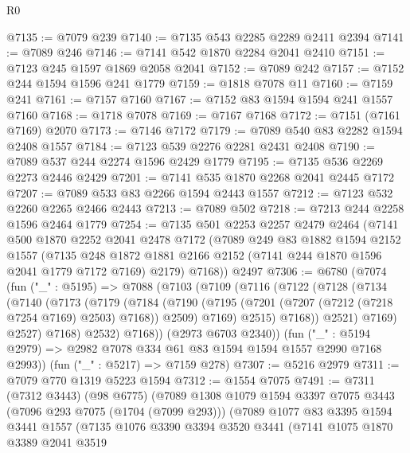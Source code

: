 \begin{lexlean}{R0}
\begin{coremodule}
@7135 := @7079 @239
@7140 := @7135 @543 @2285 @2289 @2411 @2394
@7141 := @7089 @246
@7146 := @7141 @542 @1870 @2284 @2041 @2410
@7151 := @7123 @245 @1597 @1869 @2058 @2041
@7152 := @7089 @242
@7157 := @7152 @244 @1594 @1596 @241 @1779
@7159 := @1818 @7078 @11
@7160 := @7159 @241
@7161 := @7157 @7160
@7167 := @7152 @83 @1594 @1594 @241 @1557 @7160
@7168 := @1718 @7078
@7169 := @7167 @7168
@7172 := @7151 (@7161 @7169) @2070
@7173 := @7146 @7172
@7179 := @7089 @540 @83 @2282 @1594 @2408 @1557
@7184 := @7123 @539 @2276 @2281 @2431 @2408
@7190 := @7089 @537 @244 @2274 @1596 @2429 @1779
@7195 := @7135 @536 @2269 @2273 @2446 @2429
@7201 := @7141 @535 @1870 @2268 @2041 @2445 @7172
@7207 := @7089 @533 @83 @2266 @1594 @2443 @1557
@7212 := @7123 @532 @2260 @2265 @2466 @2443
@7213 := @7089 @502
@7218 := @7213 @244 @2258 @1596 @2464 @1779
@7254 := @7135
    @501
    @2253
    @2257
    @2479
    @2464
    (@7141
      @500
      @1870
      @2252
      @2041
      @2478
      @7172
      (@7089
        @249
        @83
        @1882
        @1594
        @2152
        @1557
        (@7135 @248 @1872 @1881 @2166 @2152 (@7141 @244 @1870 @1596 @2041 @1779 @7172 @7169) @2179)
        @7168))
    @2497
@7306 := @6780
    (@7074
      (fun ("_" : @5195) =>
      @7088
        (@7103
          (@7109
            (@7116
              (@7122
                (@7128
                  (@7134
                    (@7140
                      (@7173
                        (@7179
                          (@7184
                            (@7190
                              (@7195 (@7201 (@7207 (@7212 (@7218 @7254 @7169) @2503) @7168)) @2509)
                              @7169)
                            @2515)
                          @7168))
                      @2521)
                    @7169)
                  @2527)
                @7168)
              @2532)
            @7168))
        (@2973 @6703 @2340))
      (fun ("_" : @5194 @2979) => @2982 @7078 @334 @61 @83 @1594 @1594 @1557 @2990 @7168 @2993))
    (fun ("_" : @5217) => @7159 @278)
@7307 := @5216 @2979
@7311 := @7079 @770 @1319 @5223 @1594
@7312 := @1554 @7075
@7491 := @7311
    (@7312 @3443)
    (@98 @6775)
    (@7089
      @1308
      @1079
      @1594
      @3397
      @7075
      @3443
      (@7096 @293 @7075 (@1704 (@7099 @293)))
      (@7089
        @1077
        @83
        @3395
        @1594
        @3441
        @1557
        (@7135
          @1076
          @3390
          @3394
          @3520
          @3441
          (@7141
            @1075
            @1870
            @3389
            @2041
            @3519

\end{coremodule}
\end{lexlean}
